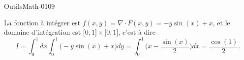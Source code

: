 
\begin{corrige}{OutilsMath-0109}

    La fonction à intégrer est $f(x,y)=\nabla\cdot F(x,y)=-y\sin(x)+x$, et le domaine d'intégration est $\mathopen[ 0 , 1 \mathclose]\times\mathopen[ 0 , 1 \mathclose]$, c'est à dire
    \begin{equation}
        I=\int_0^1dx\int_0^1 \big( -y\sin(x)+x \big)dy=\int_0^1\big( x-\frac{ \sin(x) }{2} \big)dx=\frac{ \cos(1) }{2}.
    \end{equation}

\end{corrige}
